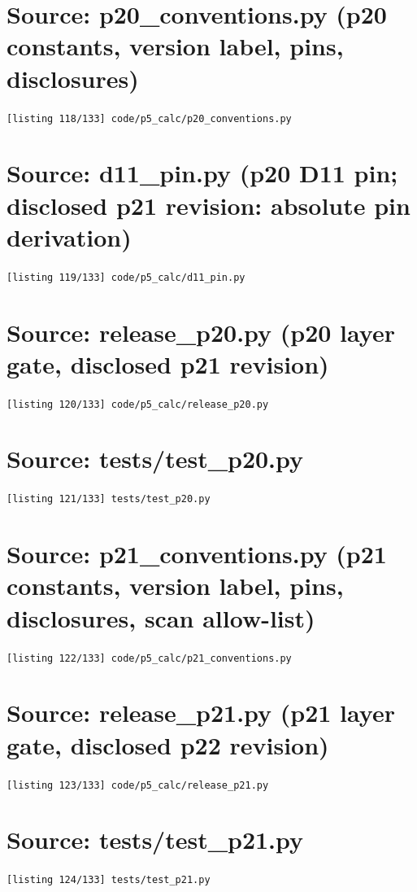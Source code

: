 \section{Source: p20\_conventions.py (p20 constants, version label, pins, disclosures)}
\noindent\texttt{[listing 118/133] code/p5\_calc/p20\_conventions.py}
{\scriptsize}

\section{Source: d11\_pin.py (p20 D11 pin; disclosed p21 revision: absolute pin derivation)}
\noindent\texttt{[listing 119/133] code/p5\_calc/d11\_pin.py}
{\scriptsize}

\section{Source: release\_p20.py (p20 layer gate, disclosed p21 revision)}
\noindent\texttt{[listing 120/133] code/p5\_calc/release\_p20.py}
{\scriptsize}

\section{Source: tests/test\_p20.py}
\noindent\texttt{[listing 121/133] tests/test\_p20.py}
{\scriptsize}

\section{Source: p21\_conventions.py (p21 constants, version label, pins, disclosures, scan allow-list)}
\noindent\texttt{[listing 122/133] code/p5\_calc/p21\_conventions.py}
{\scriptsize}

\section{Source: release\_p21.py (p21 layer gate, disclosed p22 revision)}
\noindent\texttt{[listing 123/133] code/p5\_calc/release\_p21.py}
{\scriptsize}

\section{Source: tests/test\_p21.py}
\noindent\texttt{[listing 124/133] tests/test\_p21.py}
{\scriptsize}

